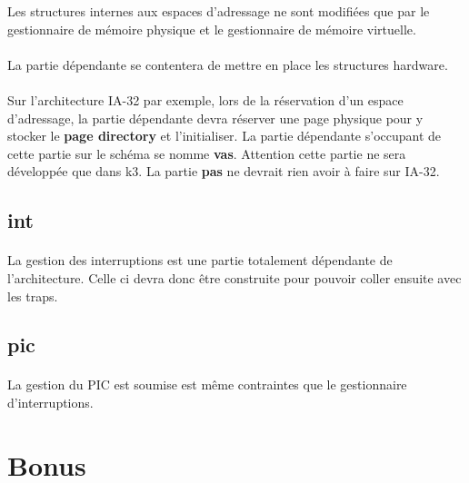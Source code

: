 \documentclass[10pt,a4wide]{article}
\begin{document}
Les structures internes aux espaces d'adressage ne sont modifi\'ees que
par le gestionnaire de m\'emoire physique et le gestionnaire de m\'emoire
virtuelle.

\paragraph{}

La partie d\'ependante se contentera de mettre en place les structures
hardware.

\paragraph{}

Sur l'architecture IA-32 par exemple, lors de la r\'eservation
d'un espace d'adressage, la partie d\'ependante devra r\'eserver une page
physique pour y stocker le \textbf{page directory} et l'initialiser. La
partie d\'ependante s'occupant de cette partie sur le sch\'ema se nomme
\textbf{vas}. Attention cette partie ne sera d\'evelopp\'ee que dans k3.
La partie \textbf{pas} ne devrait rien avoir \`a faire sur IA-32.

\subsection{int}

\paragraph{}

La gestion des interruptions est une partie totalement d\'ependante de
l'architecture. Celle ci devra donc \^etre construite pour pouvoir
coller ensuite avec les traps.

\subsection{pic}

\paragraph{}

La gestion du PIC est soumise est m\^eme contraintes que le gestionnaire
d'interruptions.

\section{Bonus}
\end{document}
